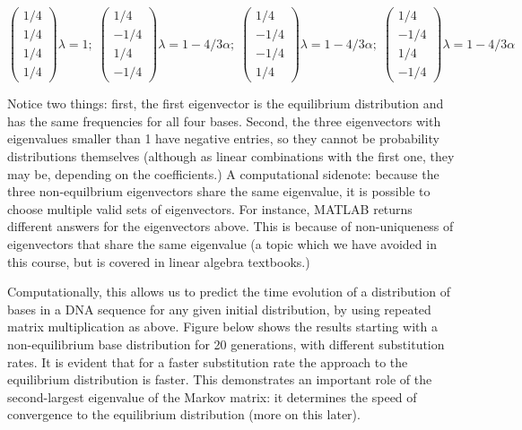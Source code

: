 \documentclass[
  letterpaper,
  DIV=11,
  numbers=noendperiod]{scrreprt}
\begin{document}
\[  
\left(\begin{array}{c} 1/4 \\ 1/4 \\ 1/4 \\ 1/4 \end{array}\right) \lambda =1; \; \left(\begin{array}{c} 1/4 \\ -1/4 \\ 1/4 \\ -1/4 \end{array}\right)\lambda =1-4/3\alpha;  \; \left(\begin{array}{c} 1/4 \\ -1/4 \\ -1/4 \\ 1/4 \end{array}\right)\lambda =1-4/3\alpha;  \; \left(\begin{array}{c} 1/4 \\ -1/4 \\ 1/4 \\ -1/4 \end{array}\right)\lambda =1-4/3\alpha 
\]

Notice two things: first, the first eigenvector is the equilibrium
distribution and has the same frequencies for all four bases. Second,
the three eigenvectors with eigenvalues smaller than 1 have negative
entries, so they cannot be probability distributions themselves
(although as linear combinations with the first one, they may be,
depending on the coefficients.) A computational sidenote: because the
three non-equilbrium eigenvectors share the same eigenvalue, it is
possible to choose multiple valid sets of eigenvectors. For instance,
MATLAB returns different answers for the eigenvectors above. This is
because of non-uniqueness of eigenvectors that share the same eigenvalue
(a topic which we have avoided in this course, but is covered in linear
algebra textbooks.)

Computationally, this allows us to predict the time evolution of a
distribution of bases in a DNA sequence for any given initial
distribution, by using repeated matrix multiplication as above. Figure
below shows the results starting with a non-equilibrium base
distribution for 20 generations, with different substitution rates. It
is evident that for a faster substitution rate the approach to the
equilibrium distribution is faster. This demonstrates an important role
of the second-largest eigenvalue of the Markov matrix: it determines the
speed of convergence to the equilibrium distribution (more on this
later).
\end{document}
